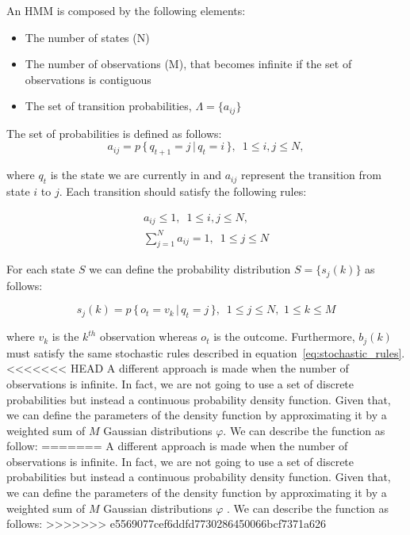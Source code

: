 \noindent An HMM is composed by the following elements:

\begin{itemize}
	\item The number of states (N)
	\item The number of observations (M), that becomes infinite if the set of observations is contiguous
	\item The set of transition probabilities, $\Lambda = \{ a_{ij}\}$
\end{itemize}

The set of probabilities is defined as follows:
\begin{equation}
\label{eq:transition_probabilities}
a_{ij} = p \, \{ \, q_{t+1} = j \, | \, q_{t} = i \, \}, \, \, \, 1 \leq i,j \leq N,
\end{equation}

\noindent where $q_{t}$ is the state we are currently in and $a_{ij}$ represent the transition from state $i$ to $j$.
Each transition should satisfy the following rules:

\begin{subequations}
	\label{eq:stochastic_rules}
	\begin{align}
	a_{ij} \le 1, \, \, \, 1 \leq i,j \leq N, \\ %
	\sum_{j=1}^{N} a_{ij} = 1, \, \, \, 1 \leq j \leq N
	\end{align}
\end{subequations}

\noindent For each state $S$ we can define the probability distribution $S = \{s_{j}(k)\}$ as follows:

\begin{equation}
s_{j}(k) = p \, \{\, o_{t} = v_{k} \, | \, q_{t} = j \, \}, \, \, \, 1 \leq j \leq N, \,\, 1 \leq k \leq M
\end{equation}

\noindent where $v_k$ is the $k^{th}$ observation whereas $o_{t}$ is the outcome. Furthermore, $b_{j}(k)$ must satisfy the same stochastic rules described in equation~\ref{eq:stochastic_rules}. \\

<<<<<<< HEAD
\noindent A different approach is made when the number of observations is infinite. In fact, we are not going to use a set of discrete probabilities but instead a continuous probability density function. Given that, we can define the parameters of the density function by approximating it by a weighted sum of $M$ Gaussian distributions $\varphi$. We can describe the function as follow:
=======
\noindent A different approach is made when the number of observations is infinite. In fact, we are not going to use a set of discrete probabilities but instead a continuous probability density function. Given that, we can define the parameters of the density function by approximating it by a weighted sum of $M$ Gaussian distributions $\varphi$ \cite{def_hmm}. We can describe the function as follows:
>>>>>>> e5569077cef6ddfd7730286450066bcf7371a626


